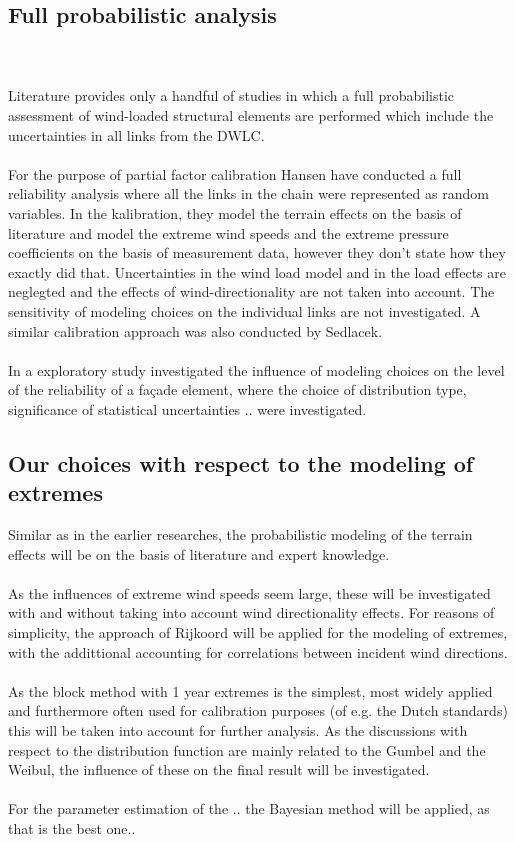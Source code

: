 \documentclass[fleqn]{article}
\begin{document}
\subsection{Full probabilistic analysis}
\\
\\
Literature provides only a handful of studies in which a full probabilistic assessment of wind-loaded structural elements are performed which include the uncertainties in all links from the DWLC. \\
\\
For the purpose of partial factor calibration Hansen \cite{Hansen_2015} have conducted a full reliability analysis where all the links in the chain were represented as random variables. In the kalibration, they model the terrain effects on the basis of literature and model the extreme wind speeds and the extreme pressure coefficients on the basis of measurement data, however they don't state how they exactly did that. Uncertainties in the wind load model and in the load effects are neglegted and the effects of wind-directionality are not taken into account. The sensitivity of modeling choices on the individual links are not investigated. A similar calibration approach was also conducted by Sedlacek. \\
\\
In a exploratory study \cite{Meinen_2015} investigated the influence of modeling choices on the level of the reliability of a fa\c{c}ade element, where the choice of distribution type, significance of statistical uncertainties .. were investigated. 


\subsection{Our choices with respect to the modeling of extremes}
Similar as in the earlier researches, the probabilistic modeling of the terrain effects will be on the basis of literature and expert knowledge. \\
\\
As the influences of extreme wind speeds seem large, these will be investigated with and without taking into account wind directionality effects. For reasons of simplicity, the approach of Rijkoord \cite{Rijkoord_1983} will be applied for the modeling of extremes, with the addittional accounting for correlations between incident wind directions.\\
\\
As the block method with 1 year extremes is the simplest, most widely applied and furthermore often used for calibration purposes (of e.g. the Dutch standards) this will be taken into account for further analysis. As the discussions with respect to the distribution function are mainly related to the Gumbel and the Weibul, the influence of these on the final result will be investigated. \\
\\
For the parameter estimation of the .. the Bayesian method will be applied, as that is the best one.. 
\end{document}
